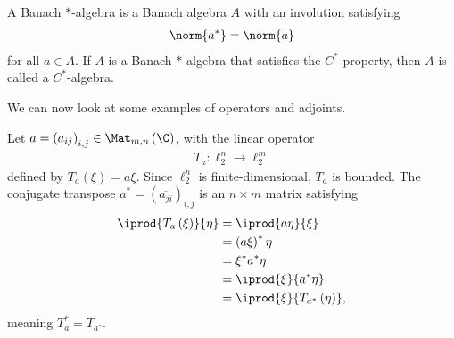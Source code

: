 \documentclass[10pt]{mypackage}
\begin{document}
\begin{definition}
  A Banach $\ast$-algebra is a Banach algebra $A$ with an involution satisfying
  \begin{align*}
    \norm{a^{\ast}} = \norm{a}
  \end{align*}
  for all $a\in A$. If $A$ is a Banach $\ast$-algebra that satisfies the $C^{\ast}$-property, then $A$ is called a $C^{\ast}$-algebra.
\end{definition}
We can now look at some examples of operators and adjoints.
\begin{example}
  Let $a = \left(a_{ij}\right)_{i,j}\in \Mat_{m,n}\left(\C\right)$, with the linear operator
  \begin{align*}
    T_{a}\colon \ell_{2}^{n}\rightarrow \ell_{2}^{m}
  \end{align*}
  defined by $T_a\left(\xi\right) = a\xi$. Since $\ell_2^{n}$ is finite-dimensional, $T_a$ is bounded. The conjugate transpose $a^{\ast} = \left(\overline{a_{ji}}\right)_{i,j}$ is an $n\times m$ matrix satisfying
  \begin{align*}
    \iprod{T_{a}\left(\xi\right)}{\eta} &= \iprod{a\eta}{\xi}\\
                                        &= \left(a\xi\right)^{\ast}\eta\\
                                        &= \xi^{\ast}a^{\ast}\eta\\
                                        &= \iprod{\xi}{a^{\ast}\eta}\\
                                        &= \iprod{\xi}{T_{a^{\ast}}\left(\eta\right)},
  \end{align*}
  meaning $T_{a}^{\ast} = T_{a^{\ast}}$.
\end{example}
\end{document}
